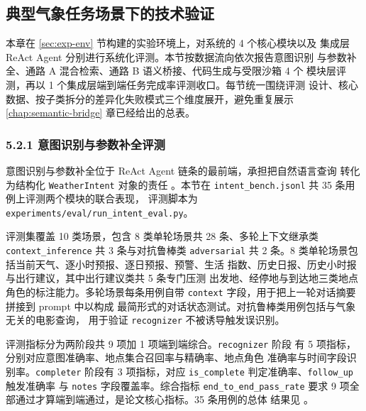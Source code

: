 
\subsection{典型气象任务场景下的技术验证}
\label{sec:scenario-eval}

本章在 \ref{sec:exp-env} 节构建的实验环境上，对系统的 4 个核心模块以及
集成层 ReAct Agent 分别进行系统化评测。本节按数据流向依次报告意图识别
与参数补全、通路 A 混合检索、通路 B 语义桥接、代码生成与受限沙箱 4 个
模块层评测，再以 1 个集成层端到端任务完成率评测收口。每节统一围绕评测
设计、核心数据、按子类拆分的差异化失败模式三个维度展开，避免重复展示
\ref{chap:semantic-bridge} 章已经给出的总表。

\subsubsection*{5.2.1 \quad 意图识别与参数补全评测}
\label{sec:intent-eval}

意图识别与参数补全位于 ReAct Agent 链条的最前端，承担把自然语言查询
转化为结构化 \texttt{WeatherIntent} 对象的责任 \cite{ref18}。本节在
\texttt{intent\_\bk{}bench.\bk{}jsonl} 共 35 条用例上评测两个模块的联合表现，
评测脚本为 \texttt{experiments/\bk{}eval/\bk{}run\_\bk{}intent\_\bk{}eval.\bk{}py}。

评测集覆盖 10 类场景，包含 8 类单轮场景共 28 条、多轮上下文继承类
\texttt{context\_\bk{}inference} 共 3 条与对抗鲁棒类 \texttt{adversarial}
共 2 条。8 类单轮场景包括当前天气、逐小时预报、逐日预报、预警、生活
指数、历史日报、历史小时报与出行建议，其中出行建议类共 5 条专门压测
出发地、经停地与到达地三类地点角色的标注能力。多轮场景每条用例自带
\texttt{context} 字段，用于把上一轮对话摘要拼接到 prompt 中以构成
最简形式的对话状态测试。对抗鲁棒类用例包括与气象无关的电影查询，
用于验证 \texttt{recognizer} 不被诱导触发误识别。

评测指标分为两阶段共 9 项加 1 项端到端综合。\texttt{recognizer} 阶段
有 5 项指标，分别对应意图准确率、地点集合召回率与精确率、地点角色
准确率与时间字段识别率。\texttt{completer} 阶段有 3 项指标，对应
\texttt{is\_\bk{}complete} 判定准确率、\texttt{follow\_\bk{}up} 触发准确率
与 \texttt{notes} 字段覆盖率。综合指标 \texttt{end\_\bk{}to\_\bk{}end\_\bk{}pass\_\bk{}rate}
要求 9 项全部通过才算端到端通过，是论文核心指标。35 条用例的总体
结果见 。

